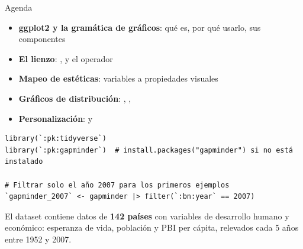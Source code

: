 \documentclass[8pt]{beamer}
\begin{document}
	\subtitle{8vo encuentro: Visualización de datos I}

	\begin{frame}[plain]
		\maketitle
	\end{frame}


	\begin{frame}[fragile]{Agenda}
		\begin{itemize}
			\item \textbf{ggplot2 y la gramática de gráficos}: qué es, por qué usarlo, sus componentes
			\item \textbf{El lienzo}: ,  y el operador \rscript{+}
			\item \textbf{Mapeo de estéticas}: variables a propiedades visuales
			\item \textbf{Gráficos de distribución}: , , 
			\item \textbf{Personalización}:  y 
		\end{itemize}


\begin{lstlisting}[style=RScript]
library(`:pk:tidyverse`)
library(`:pk:gapminder`)  # install.packages("gapminder") si no está instalado

# Filtrar solo el año 2007 para los primeros ejemplos
`gapminder_2007` <- gapminder |> filter(`:bn:year` == 2007)
\end{lstlisting}

		\begin{block}{}
			El dataset  contiene datos de \textbf{142 países} con variables de desarrollo humano y económico: esperanza de vida, población y PBI per cápita, relevados cada 5 años entre 1952 y 2007.
		\end{block}
	\end{frame}
\end{document}
